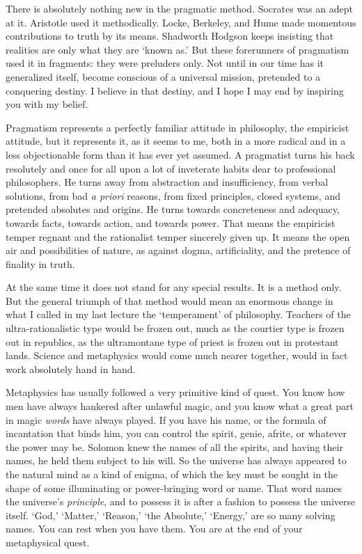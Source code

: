 There is absolutely nothing new in the pragmatic method. Socrates was
an adept at it. Aristotle used it methodically. Locke, Berkeley, and
Hume made momentous contributions to truth by its means. Shadworth
Hodgson keeps insisting that realities are only what they are
`known as.' But these forerunners of pragmatism used it in fragments:
they were preluders only. Not until in our time has it generalized
itself, become conscious of a universal mission, pretended to a
conquering destiny. I believe in that destiny, and I hope I may end by
inspiring you with my belief.

Pragmatism represents a perfectly familiar attitude in
philosophy, the empiricist attitude, but it represents it, as it seems
to me, both in a more radical and in a less objectionable form than it
has ever yet assumed. A pragmatist turns his back resolutely and
once for all upon a lot of inveterate habits dear to professional
philosophers. He turns away from abstraction and insufficiency, from
verbal solutions, from bad \textit{a priori} reasons, from fixed
principles, closed systems, and pretended absolutes and origins. He
turns towards concreteness and adequacy, towards facts, towards
action, and towards power. That means the empiricist temper regnant
and the rationalist temper sincerely given up. It means the open air
and possibilities of nature, as against dogma, artificiality, and the
pretence of finality in truth.

At the same time it does not stand for any special results. It is a
method only. But the general triumph of that method would mean an
enormous change in what I called in my last lecture the `temperament'
of philosophy.  Teachers of the ultra-rationalistic type
would be frozen out, much as the courtier type is frozen out in
republics, as the ultramontane type of priest is frozen out in
protestant lands. Science and metaphysics would come much nearer
together, would in fact work absolutely hand in hand.

Metaphysics has usually followed a very primitive kind of quest. You
know how men have always hankered after unlawful magic, and you know
what a great part in magic \textit{words} have always played. If you
have his name, or the formula of incantation that binds him, you can
control the spirit, genie, afrite, or whatever the power may be.
Solomon knew the names of all the spirits, and having their names,
he held them subject to his will. So the universe has always appeared
to the natural mind as a kind of enigma, of which the key must be
sought in the shape of some illuminating or power-bringing word or
name. That word names the universe's \textit{principle}, and to
possess it is after a fashion to possess the universe itself. `God,'
`Matter,' `Reason,' `the Absolute,' `Energy,' are so  many
solving names. You can rest when you have them. You are at the end of
your metaphysical quest.

